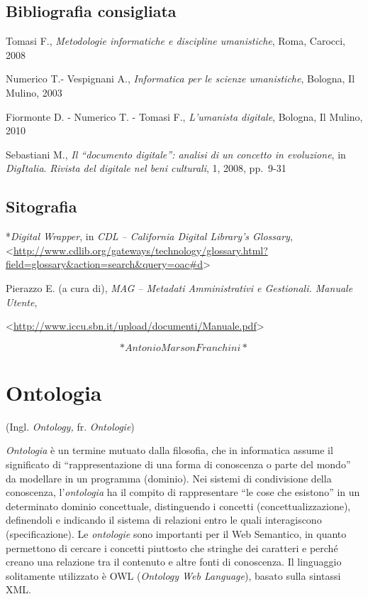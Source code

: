 \documentclass[
  b5paper,
  twoside,
  11pt,
  chapterprefix=false,
  bibliography=totocnumbered,
  listof=flat]{scrbook}
\begin{document}
\hypertarget{bibliografia-consigliata-17}{%
\section*{Bibliografia consigliata}\label{bibliografia-consigliata-17}}

Tomasi F., \emph{Metodologie informatiche e discipline umanistiche}, Roma,
Carocci, 2008

Numerico T.- Vespignani A., \emph{Informatica per le scienze umanistiche},
Bologna, Il Mulino, 2003

Fiormonte D. - Numerico T. - Tomasi F., \emph{L'umanista digitale}, Bologna,
Il Mulino, 2010

Sebastiani M., \emph{Il \enquote{documento digitale}: analisi di un concetto in
evoluzione}, in \emph{DigItalia}. \emph{Rivista del digitale nel beni culturali},
1, 2008, pp.~9-31

\hypertarget{sitografia-21}{%
\section*{Sitografia}\label{sitografia-21}}

*\emph{Digital Wrapper}, in \emph{CDL -- California Digital Library's Glossary},
\textless{}\href{http://www.cdlib.org/gateways/technology/glossary.html?field=glossary\&action=search\&query=oac\#d}{{http://www.cdlib.org/gateways/technology/glossary.html?field=glossary\&action=search\&query=oac\#d}}\textgreater{}

Pierazzo E. (a cura di), \emph{MAG -- Metadati Amministrativi e Gestionali.
Manuale Utente},

\textless{}{\url{http://www.iccu.sbn.it/upload/documenti/Manuale.pdf}\textgreater{}}

\[*Antonio Marson Franchini*\]

\hypertarget{ontologia}{%
\chapter{Ontologia}\label{ontologia}}

(Ingl. \emph{Ontology,} fr. \emph{Ontologie})

\emph{Ontologia} è un termine mutuato dalla filosofia, che in informatica
assume il significato di \enquote{rappresentazione di una forma di conoscenza o
parte del mondo} da modellare in un programma (dominio). Nei sistemi di
condivisione della conoscenza, l'\emph{ontologia} ha il compito di
rappresentare \enquote{le cose che esistono} in un determinato dominio
concettuale, distinguendo i concetti (concettualizzazione), definendoli
e indicando il sistema di relazioni entro le quali interagiscono
(specificazione). Le \emph{ontologie} sono importanti per il Web Semantico,
in quanto permettono di cercare i concetti piuttosto che stringhe dei
caratteri e perché creano una relazione tra il contenuto e altre fonti
di conoscenza. Il linguaggio solitamente utilizzato è OWL (\emph{Ontology Web
Language}), basato sulla sintassi XML.
\end{document}
